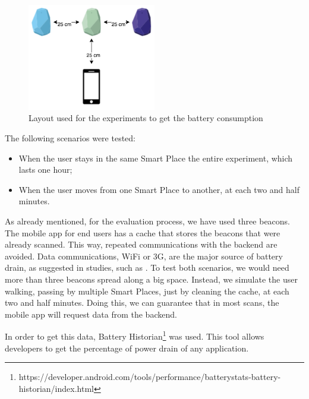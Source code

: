 \begin{figure}[!ht]
  \centering
    \includegraphics[width=0.5\textwidth, keepaspectratio]{images/experiments_battery_layout}
    \caption[Layout for experiments of battery consumption]{Layout used for the experiments to get the battery consumption}
    \label{fig:layout_experiments_battery_consumption}
\end{figure}

The following scenarios were tested:
\begin{itemize}
  \item When the user stays in the same Smart Place the entire experiment, which lasts one hour;
  \item When the user moves from one Smart Place to another, at each two and half minutes.
\end{itemize}

As already mentioned, for the evaluation process, we have used three  beacons.
The mobile app for end users has a cache that stores the beacons that were already scanned.
This way, repeated communications with the backend are avoided.
Data communications, \gls{WiFi} or \gls{3G}, are the major source of battery drain, as suggested in studies, such as \cite{energy}.
To test both scenarios, we would need more than three beacons spread along a big space.
Instead, we simulate the user walking, passing by multiple Smart Places, just by cleaning the cache,
at each two and half minutes.
Doing this, we can guarantee that in most scans, the mobile app will request data from the backend.

In order to get this data, Battery Historian\footnote{https://developer.android.com/tools/performance/batterystats-battery-historian/index.html} was used. This tool allows developers to get the percentage of power drain of any application.


